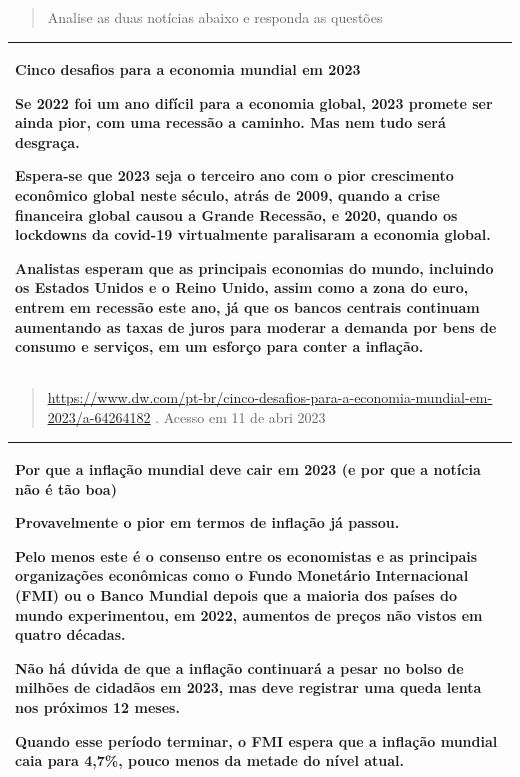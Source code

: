 
\begin{quote}
Analise as duas notícias abaixo e responda as questões
\end{quote}

\begin{longtable}[]{@{}
  >{\raggedright\arraybackslash}p{}@{}}
\toprule
\endhead
\textbf{Cinco desafios para a economia mundial em 2023}

Se 2022 foi um ano difícil para a economia global, 2023 promete ser
ainda pior, com uma recessão a caminho. Mas nem tudo será desgraça.

Espera-se que 2023 seja o terceiro ano com o pior crescimento econômico
global neste século, atrás de 2009, quando a crise financeira global
causou a Grande Recessão, e 2020, quando os lockdowns da covid-19
virtualmente paralisaram a economia global.

Analistas esperam que as principais economias do mundo, incluindo os
Estados Unidos e o Reino Unido, assim como a zona do euro, entrem em
recessão este ano, já que os bancos centrais continuam aumentando as
taxas de juros para moderar a demanda por bens de consumo e serviços, em
um esforço para conter a inflação. \\
\bottomrule
\end{longtable}

\begin{quote}
\href{https://www.dw.com/pt-br/cinco-desafios-para-a-economia-mundial-em-2023/a-64264182}{\uline{https://www.dw.com/pt-br/cinco-desafios-para-a-economia-mundial-em-2023/a-64264182}}
. Acesso em 11 de abri 2023
\end{quote}

\begin{longtable}[]{@{}
  >{\raggedright\arraybackslash}p{}@{}}
\toprule
\endhead
\textbf{Por que a inflação mundial deve cair em 2023 (e por que a
notícia não é tão boa)}

Provavelmente o pior em termos de inflação já passou.

Pelo menos este é o consenso entre os economistas e as principais
organizações econômicas como o Fundo Monetário Internacional (FMI) ou o
Banco Mundial depois que a maioria dos países do mundo experimentou, em
2022, aumentos de preços não vistos em quatro décadas.

Não há dúvida de que a inflação continuará a pesar no bolso de milhões
de cidadãos em 2023, mas deve registrar uma queda lenta nos próximos 12
meses.

Quando esse período terminar, o FMI espera que a inflação mundial caia
para 4,7\%, pouco menos da metade do nível atual. \\
\bottomrule
\end{longtable}


